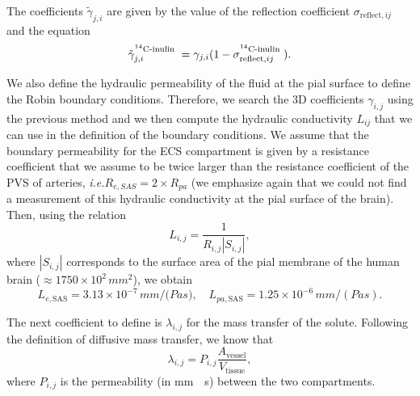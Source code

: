 \documentclass[10pt]{article}
\newcommand{\ie}{\emph{i.e.}\;}
\newcommand{\1}{^{(1)}}
\newcommand{\2}{^{(2)}}
\newcommand{\abs}[1]{\left\lvert#1\right\rvert}
\newcommand{\Cinulin}{$\prescript{14}{}{\text{C}}$-inulin }
\begin{document}
The coefficients $\tilde \gamma_{j , i}$ are given by the value of the reflection coefficient $\sigma_{\text{reflect},ij}$ and the equation
\begin{equation}
    \tilde \gamma^\text{\Cinulin}_{j, i} =  \gamma_{j, i}(1-\sigma_{\text{reflect},ij}^\text{\Cinulin}).
    \label{eq:gamma-tilde}
\end{equation}

We also define the hydraulic permeability of the fluid at the pial surface to define the Robin boundary conditions. 
Therefore, we search the 3D coefficients $\gamma_{i,j}$ using the previous method and we then compute the hydraulic conductivity $L_{ij}$ that we can use in the definition of the boundary conditions. 
We assume that the boundary permeability for the ECS compartment is given by a resistance coefficient that we assume to be twice larger than the resistance coefficient of the PVS of arteries, \ie $R_{e,SAS} = 2 \times R_{pa}$ (we emphasize again that we could not find a measurement of this hydraulic conductivity at the pial surface of the brain). 
Then, using the relation
\[
L_{i,j} = \frac{1}{R_{i,j}\abs{S_{i,j}}},
\]
where $\abs{S_{i,j}}$ corresponds to the surface area of the pial membrane of the human brain ($\approx 1750 \times 10^2 \, \si{mm^2}$), we obtain
\[
L_{e,\text{SAS}} = 3.13 \times 10^{-7} \, \si{mm/(Pa s}),\quad L_{pa,\text{SAS}} = 1.25 \times 10^{-6} \, \si{mm/(Pa s)}.
\]

The next coefficient to define is $\lambda_{i, j}$ for the mass transfer of the solute. Following the definition of diffusive mass transfer, we know that 
\begin{equation}
    \lambda_{i, j} =  P_{i, j} \frac{A_\text{vessel}}{V_\text{tissue}},
\end{equation}
where $P_{i,j}$ is the permeability (in \si{mm \per \second}) between the two compartments.
\end{document}
